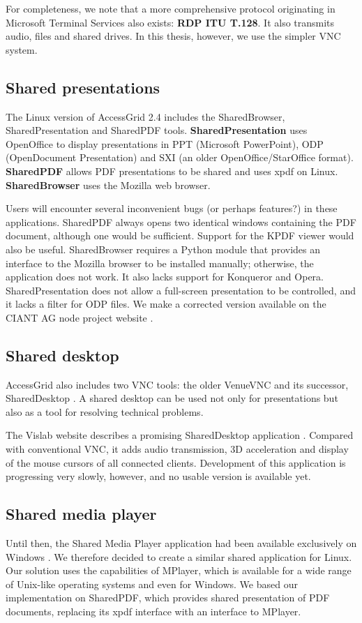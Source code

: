 For completeness, we note that a more comprehensive protocol originating in Microsoft Terminal Services also exists: \textbf{RDP ITU T.128}. It also transmits audio, files and shared drives. In this thesis, however, we use the simpler VNC system.


\subsection{Shared presentations}
The Linux version of AccessGrid 2.4 includes the SharedBrowser, SharedPresentation and SharedPDF tools. \textbf{SharedPresentation} uses OpenOffice to display presentations in PPT (Microsoft PowerPoint), ODP (OpenDocument Presentation) and SXI (an older OpenOffice/StarOffice format). \textbf{SharedPDF} allows PDF presentations to be shared and uses xpdf on Linux. \textbf{SharedBrowser} uses the Mozilla web browser.

Users will encounter several inconvenient bugs (or perhaps features?) in these applications. SharedPDF always opens two identical windows containing the PDF document, although one would be sufficient. Support for the KPDF viewer would also be useful. SharedBrowser requires a Python module that provides an interface to the Mozilla browser to be installed manually; otherwise, the application does not work. It also lacks support for Konqueror and Opera. SharedPresentation does not allow a full-screen presentation to be controlled, and it lacks a filter for ODP files. We make a corrected version available on the CIANT AG node project website \cite{CIANT-AGnodeWiki}.

\subsection{Shared desktop}
AccessGrid also includes two VNC tools: the older VenueVNC and its successor, SharedDesktop \cite{AG-SharedDesktop}. A shared desktop can be used not only for presentations but also as a tool for resolving technical problems.

The Vislab website describes a promising SharedDesktop application \cite{Vislab-SharedDesktop}. Compared with conventional VNC, it adds audio transmission, 3D acceleration and display of the mouse cursors of all connected clients. Development of this application is progressing very slowly, however, and no usable version is available yet.

\subsection{Shared media player}
Until then, the Shared Media Player application had been available exclusively on Windows \cite{AG-SharedMoviePlayer}. We therefore decided to create a similar shared application for Linux. Our solution uses the capabilities of MPlayer, which is available for a wide range of Unix-like operating systems and even for Windows. We based our implementation on SharedPDF, which provides shared presentation of PDF documents, replacing its xpdf interface with an interface to MPlayer.

